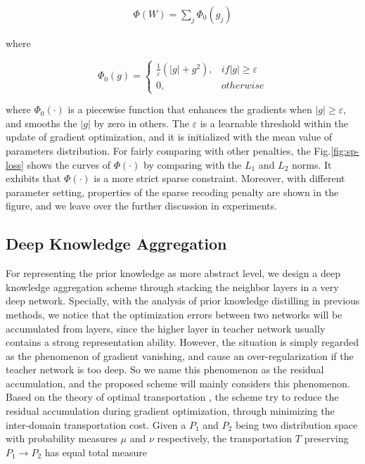 \documentclass[10pt,twocolumn,letterpaper]{article}
\begin{document}
\begin{equation}
\begin{split}
\Phi(W) = \sum_{j}\Phi_0(g_{j})
\label{eq:sp-loss}
\end{split}
\end{equation}

where

\begin{equation}
\Phi_0(g)=
\begin{cases}
\frac{1}{\varepsilon}(|g| + g^2), &if|g| \geq \varepsilon \\
0, &otherwise
\end{cases}
\label{eq:sp-loss-cases}
\end{equation}

where $\Phi_0(\cdot)$ is a piecewise function that
enhances the gradients when $|g| \geq \varepsilon$,
and smooths the $|g|$ by zero in others.
The $\varepsilon$ is a learnable threshold within the update of gradient optimization,
and it is initialized with the mean value of parameters distribution.
For fairly comparing with other penalties,
the Fig.\ref{fig:sp-loss} shows
the curves of $\Phi(\cdot)$ by comparing with the $L_1$ and $L_2$ norms.
It exhibits that $\Phi(\cdot)$ is a more strict sparse constraint.
Moreover, with different parameter setting,
properties of the sparse recoding penalty are shown in the figure,
and we leave over the further discussion in experiments.


\subsection{Deep Knowledge Aggregation} \label{3dot3}
For representing the prior knowledge as more abstract level,
we design a deep knowledge aggregation scheme
through stacking the neighbor layers in a very deep network.
Specially,
with the analysis of prior knowledge distilling in previous methods,
we notice that the optimization errors between two networks will be accumulated from layers,
since the higher layer in teacher network usually contains a strong representation ability.
However,
the situation is simply regarded as the phenomenon of gradient vanishing,
and cause an over-regularization if the teacher network is too deep.
So we name this phenomenon as the residual accumulation,
and the proposed scheme will mainly considers this phenomenon.
Based on the theory of optimal transportation \cite{Martin2017, Na2017A},
the scheme try to reduce the residual accumulation during gradient optimization,
through minimizing the inter-domain transportation cost.
Given a $P_1$ and $P_2$ being two distribution space
with probability measures $\mu$ and $\nu$ respectively,
the transportation $T$ preserving $P_1 \rightarrow P_2$ has equal total measure
\end{document}
